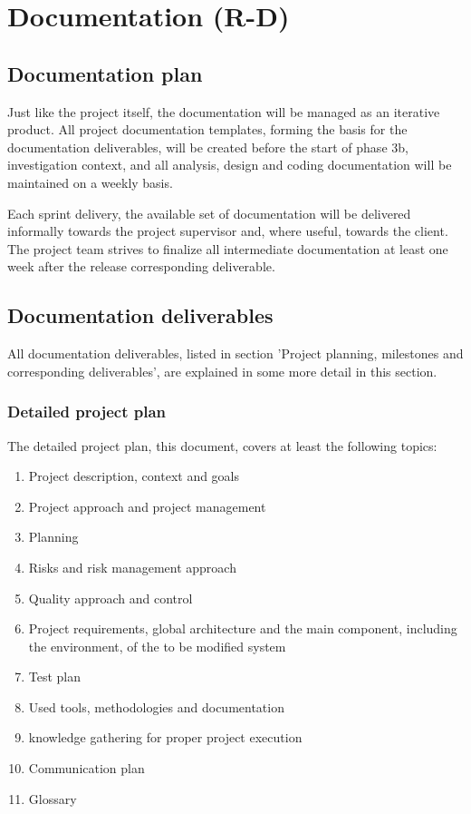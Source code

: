 
\section{Documentation (R-D)}
\label{sec:documentation}
\subsection{Documentation plan}
%
Just like the project itself, the documentation will be managed as an iterative product. 
All project documentation templates, forming the basis for the documentation deliverables, will be created before the start of phase 3b, investigation context, and all analysis, design and coding documentation will be maintained on a weekly basis.

Each sprint delivery, the available set of documentation will be delivered informally towards the project supervisor and, where useful, towards the client.
The project team strives to finalize all intermediate documentation at least one week after the release corresponding deliverable.

\subsection{Documentation deliverables}

All documentation deliverables, listed in section 'Project planning, milestones and corresponding deliverables', are explained in some more detail in this section.

\subsubsection{Detailed project plan}
The detailed project plan, this document, covers at least the following topics:

 	\begin{enumerate}
		\item Project description, context and goals
		\item Project approach and project management
		\item Planning
		\item Risks and risk management approach
		\item Quality approach and control
		\item Project requirements, global architecture and the main component, including the environment, of the to be modified system
		\item Test plan
		\item Used tools, methodologies and documentation
		\item knowledge gathering for proper project execution
		\item Communication plan
		\item Glossary
	\end {enumerate}

